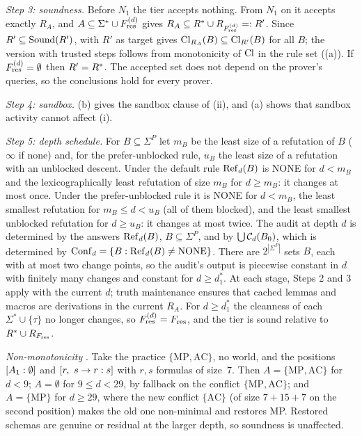 \emph{Step 3: soundness.} Before $N_1$ the tier accepts nothing. From $N_1$ on it accepts exactly $R_A$, and $A\subseteq\Sigma^*\cup F^{(d)}_{\mathrm{res}}$ gives $R_A\subseteq R^{*}\cup R_{F^{(d)}_{\mathrm{res}}}=:R'$. Since $R'\subseteq\mathrm{Sound}(R')$,  with $R'$ as target gives $\mathrm{Cl}_{R_A}(B)\subseteq\mathrm{Cl}_{R'}(B)$ for all $B$; the version with trusted steps follows from monotonicity of $\mathrm{Cl}$ in the rule set ((a)). If $F^{(d)}_{\mathrm{res}}=\emptyset$ then $R'=R^{*}$. The accepted set does not depend on the prover's queries, so the conclusions hold for every prover.

\emph{Step 4: sandbox.} (b) gives the sandbox clause of (ii), and (a) shows that sandbox activity cannot affect (i).

\emph{Step 5: depth schedule.} For $B\subseteq\Sigma^P$ let $m_B$ be the least size of a refutation of $B$ ($\infty$ if none) and, for the prefer-unblocked rule, $u_B$ the least size of a refutation with an unblocked descent. Under the default rule $\mathrm{Ref}_d(B)$ is NONE for $d<m_B$ and the lexicographically least refutation of size $m_B$ for $d\ge m_B$: it changes at most once. Under the prefer-unblocked rule it is NONE for $d<m_B$, the least smallest refutation for $m_B\le d<u_B$ (all of them blocked), and the least smallest unblocked refutation for $d\ge u_B$: it changes at most twice. The audit at depth $d$ is determined by the answers $\mathrm{Ref}_d(B)$, $B\subseteq\Sigma^P$, and by $\bigcup\mathcal{C}_d(B_0)$, which is determined by $\mathrm{Conf}_d=\{B:\mathrm{Ref}_d(B)\neq\text{NONE}\}$. There are $2^{|\Sigma^P|}$ sets $B$, each with at most two change points, so the audit's output is piecewise constant in $d$ with finitely many changes and constant for $d\ge d_1^*$. At each stage, Steps 2 and 3 apply with the current $d$; truth maintenance ensures that cached lemmas and macros are derivations in the current $R_A$. For $d\ge d_1^*$ the cleanness of each $\Sigma^*\cup\{\tau\}$ no longer changes, so $F^{(d)}_{\mathrm{res}}=F_{\mathrm{res}}$, and the tier is sound relative to $R^{*}\cup R_{F_{\mathrm{res}}}$.

\emph{Non-monotonicity} . Take the practice $\{\mathrm{MP},\mathrm{AC}\}$, no world, and the positions $[A_1 : \emptyset]$ and $[r,\ s\to r : s]$ with $r,s$ formulas of size~$7$. Then $A=\{\mathrm{MP},\mathrm{AC}\}$ for $d<9$; $A=\emptyset$ for $9\le d<29$, by fallback on the conflict $\{\mathrm{MP},\mathrm{AC}\}$; and $A=\{\mathrm{MP}\}$ for $d\ge29$, where the new conflict $\{\mathrm{AC}\}$ (of size $7+15+7$ on the second position) makes the old one non-minimal and restores MP. Restored schemas are genuine or residual at the larger depth, so soundness is unaffected.

